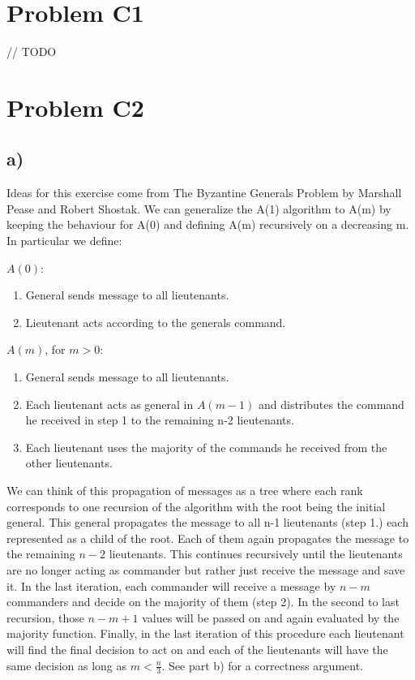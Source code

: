 \documentclass[12pt]{article}
\begin{document}
\lstset{language=C++}

\section*{Problem C1}
// TODO

\section*{Problem C2}
\subsection*{a)}
Ideas for this exercise come from The Byzantine Generals Problem by Marshall Pease and Robert Shostak.
We can generalize the A(1) algorithm to A(m) by keeping the behaviour for A(0) and defining A(m) recursively on a decreasing m. In particular we define:

$A(0)$:
\begin{enumerate}
\item General sends message to all lieutenants.
\item Lieutenant acts according to the generals command.
\end{enumerate}

$A(m)$, for $m>0$:
\begin{enumerate}
\item General sends message to all lieutenants.
\item Each lieutenant acts as general in $A(m-1)$ and distributes the command he received in step 1 to the remaining n-2 lieutenants.
\item Each lieutenant uses the majority of the commands he received from the other lieutenants.
\end{enumerate}
We can think of this propagation of messages as a tree where each rank corresponds to one recursion of the algorithm with the root being the initial general. This general propagates the message to all n-1 lieutenants (step 1.) each represented as a child of the root. Each of them again propagates the message to the remaining $n-2$ lieutenants. This continues recursively until the lieutenants are no longer acting as commander but rather just receive the message and save it. In the last iteration, each commander will receive a message by $n-m$ commanders and decide on the majority of them (step 2). In the second to last recursion, those $n-m+1$ values will be passed on and again evaluated by the majority function. Finally, in the last iteration of this procedure each lieutenant will find the final decision to act on and each of the lieutenants will have the same decision as long as $m < \frac{n}{3}$. See part b) for a correctness argument.
\end{document}
